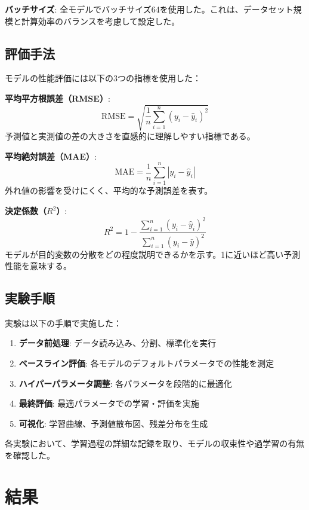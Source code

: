 \documentclass[12pt,a4paper,dvipdfmx]{jsarticle}
\begin{document}
\textbf{バッチサイズ}: 全モデルでバッチサイズ64を使用した。これは、データセット規模と計算効率のバランスを考慮して設定した。

\subsection{評価手法}

モデルの性能評価には以下の3つの指標を使用した：

\textbf{平均平方根誤差（RMSE）}: 
\begin{equation}
    \text{RMSE} = \sqrt{\frac{1}{n} \sum_{i=1}^{n}(y_i - \hat{y}_i)^2}
\end{equation}
予測値と実測値の差の大きさを直感的に理解しやすい指標である。

\textbf{平均絶対誤差（MAE）}: 
\begin{equation}
    \text{MAE} = \frac{1}{n} \sum_{i=1}^{n}|y_i - \hat{y}_i|
\end{equation}
外れ値の影響を受けにくく、平均的な予測誤差を表す。

\textbf{決定係数（$R^2$）}: 
\begin{equation}
    R^2 = 1 - \frac{\sum_{i=1}^{n}(y_i - \hat{y}_i)^2}{\sum_{i=1}^{n}(y_i - \bar{y})^2}
\end{equation}
モデルが目的変数の分散をどの程度説明できるかを示す。1に近いほど高い予測性能を意味する。

\subsection{実験手順}

実験は以下の手順で実施した：

\begin{enumerate}
    \item \textbf{データ前処理}: データ読み込み、分割、標準化を実行
    \item \textbf{ベースライン評価}: 各モデルのデフォルトパラメータでの性能を測定
    \item \textbf{ハイパーパラメータ調整}: 各パラメータを段階的に最適化
    \item \textbf{最終評価}: 最適パラメータでの学習・評価を実施
    \item \textbf{可視化}: 学習曲線、予測値散布図、残差分布を生成
\end{enumerate}

各実験において、学習過程の詳細な記録を取り、モデルの収束性や過学習の有無を確認した。

\section{結果}
\end{document}
